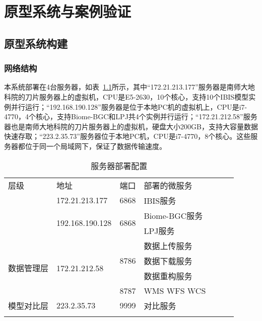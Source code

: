 \chapter{原型系统与案例验证}
\section{原型系统构建}
\subsection{网络结构}
本系统部署在4台服务器，如表~\ref{tab:server-cfg}所示，其中“172.21.213.177”服务器是南师大地科院的刀片服务器上的虚拟机，CPU是E5-2630，10个核心，支持10个IBIS模型实例并行运行；“192.168.190.128”服务器是位于本地PC机的虚拟机上，CPU是i7-4770，4个核心，支持Biome-BGC和LPJ共4个实例并行运行；“172.21.212.58”服务器也是南师大地科院的刀片服务器上的虚拟机，硬盘大小200GB，支持大容量数据快速存取；“223.2.35.73”服务器位于本地PC机，CPU是i7-4770，8个核心。这些服务器都位于同一个局域网下，保证了数据传输速度。

\begin{table}[H]
    \centering
    \caption{服务器部署配置}
    \label{tab:server-cfg}
    \begin{threeparttable}
        \begin{tabular}{lllllll}
            \Xhline{1.5pt}
            层级 & 地址 & 端口 & 部署的微服务 \\
            \Xhline{1pt}
            \multirow{3}{*}{模型计算层} & 172.21.213.177 & 6868 & IBIS服务 \\
            & \multirow{2}{*}{192.168.190.128} & \multirow{2}{*}{6868} & Biome-BGC服务 \\
            &&& LPJ服务 \\
            \hline
            \multirow{4}{*}{数据管理层} & \multirow{4}{*}{172.21.212.58} & \multirow{3}{*}{8786} & 数据上传服务 \\
            &&& 数据下载服务 \\
            &&& 数据重构服务 \\
            && 8787 & WMS WFS WCS \\
            \hline
            模型对比层 & 223.2.35.73 & 9999 & 对比服务 \\
            \Xhline{1.5pt}
        \end{tabular}
    \end{threeparttable}
\end{table}

